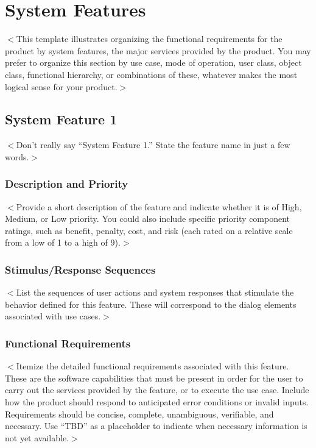 \documentclass{scrreprt}
\begin{document}
\chapter{System Features}
$<$This template illustrates organizing the functional requirements for the 
product by system features, the major services provided by the product. You may 
prefer to organize this section by use case, mode of operation, user class, 
object class, functional hierarchy, or combinations of these, whatever makes the 
most logical sense for your product.$>$

\section{System Feature 1}
$<$Don’t really say “System Feature 1.” State the feature name in just a few 
words.$>$

\subsection{Description and Priority}
$<$Provide a short description of the feature and indicate whether it is of 
High, Medium, or Low priority. You could also include specific priority 
component ratings, such as benefit, penalty, cost, and risk (each rated on a 
relative scale from a low of 1 to a high of 9).$>$

\subsection{Stimulus/Response Sequences}
$<$List the sequences of user actions and system responses that stimulate the 
behavior defined for this feature. These will correspond to the dialog elements 
associated with use cases.$>$

\subsection{Functional Requirements}
$<$Itemize the detailed functional requirements associated with this feature.  
These are the software capabilities that must be present in order for the user 
to carry out the services provided by the feature, or to execute the use case.  
Include how the product should respond to anticipated error conditions or 
invalid inputs. Requirements should be concise, complete, unambiguous, 
verifiable, and necessary. Use “TBD” as a placeholder to indicate when necessary 
information is not yet available.$>$
\end{document}
